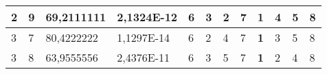 \documentclass[conference]{IEEEtran}
\begin{document}
\begin{table*}[]
\begin{tabular}{|llll|llllllll|}
\multicolumn{1}{|l|}{2}                                                     & \multicolumn{1}{l|}{9}                                                        & \multicolumn{1}{l|}{69,2111111}                                                   & 2,1324E-12                     & \multicolumn{1}{l|}{6}                                                  & \multicolumn{1}{l|}{3}                                                  & \multicolumn{1}{l|}{2}                                                  & \multicolumn{1}{l|}{7}                                                  & \multicolumn{1}{l|}{\textbf{1}}                                         & \multicolumn{1}{l|}{4}                                                  & \multicolumn{1}{l|}{5}                                                  & 8                          \\ \hline
\multicolumn{1}{|l|}{3}                                                     & \multicolumn{1}{l|}{7}                                                        & \multicolumn{1}{l|}{80,4222222}                                                   & 1,1297E-14                     & \multicolumn{1}{l|}{6}                                                  & \multicolumn{1}{l|}{2}                                                  & \multicolumn{1}{l|}{4}                                                  & \multicolumn{1}{l|}{7}                                                  & \multicolumn{1}{l|}{\textbf{1}}                                         & \multicolumn{1}{l|}{3}                                                  & \multicolumn{1}{l|}{5}                                                  & 8                          \\ \hline
\multicolumn{1}{|l|}{3}                                                     & \multicolumn{1}{l|}{8}                                                        & \multicolumn{1}{l|}{63,9555556}                                                   & 2,4376E-11                     & \multicolumn{1}{l|}{6}                                                  & \multicolumn{1}{l|}{3}                                                  & \multicolumn{1}{l|}{5}                                                  & \multicolumn{1}{l|}{7}                                                  & \multicolumn{1}{l|}{\textbf{1}}                                         & \multicolumn{1}{l|}{2}                                                  & \multicolumn{1}{l|}{4}                                                  & 8                          \\ \hline

\end{tabular}
\end{table*}
\end{document}
